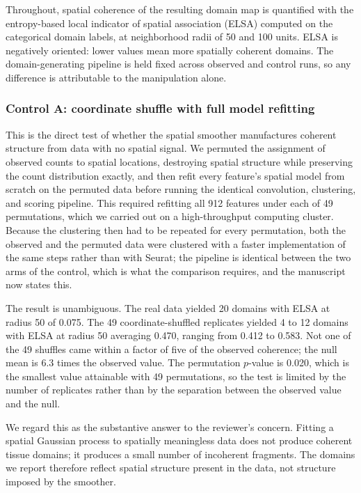 \documentclass[11pt]{article}
\begin{document}
Throughout, spatial coherence of the resulting domain map is quantified with the
entropy-based local indicator of spatial association (ELSA) computed on the categorical domain
labels, at neighborhood radii of 50 and 100 units. ELSA is negatively oriented: lower
values mean more spatially coherent domains. The domain-generating pipeline is held fixed
across observed and control runs, so any difference is attributable to the manipulation
alone.

\subsubsection*{Control A: coordinate shuffle with full model refitting}

This is the direct test of whether the spatial smoother manufactures coherent structure
from data with no spatial signal. We permuted the assignment of observed counts to spatial
locations, destroying spatial structure while preserving the count distribution exactly,
and then refit every feature's spatial model from scratch on the permuted data before
running the identical convolution, clustering, and scoring pipeline. This required
refitting all 912 features under each of 49 permutations, which we carried out on a
high-throughput computing cluster. Because the clustering then had to be repeated for every
permutation, both the observed and the permuted data were clustered with a faster
implementation of the same steps rather than with Seurat; the pipeline is identical between
the two arms of the control, which is what the comparison requires, and the manuscript now
states this.

The result is unambiguous. The real data yielded 20 domains with ELSA at radius 50 of
0.075. The 49 coordinate-shuffled replicates yielded 4 to 12 domains with ELSA at radius 50
averaging 0.470, ranging from 0.412 to 0.583. Not one of the 49 shuffles came within a
factor of five of the observed coherence; the null mean is 6.3 times the observed value.
The permutation $p$-value is 0.020, which is the smallest value attainable with 49
permutations, so the test is limited by the number of replicates rather than by the
separation between the observed value and the null.

We regard this as the substantive answer to the reviewer's concern. Fitting a spatial
Gaussian process to spatially meaningless data does not produce coherent tissue domains; it
produces a small number of incoherent fragments. The domains we report therefore reflect
spatial structure present in the data, not structure imposed by the smoother.
\end{document}
